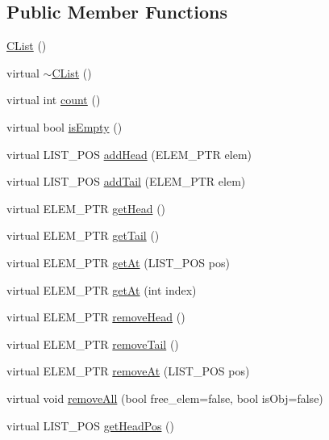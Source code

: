 \subsection*{Public Member Functions}
\begin{DoxyCompactItemize}
\item 
\hyperlink{class_c_list_ae6434f79bc2d54fbd3617214a313af97}{C\-List} ()
\item 
virtual \hyperlink{class_c_list_aba485cb512089f00dcd7a08720d8e5de}{$\sim$\-C\-List} ()
\item 
virtual int \hyperlink{class_c_list_aba5942fb294f8f3381bef96ffc8f5054}{count} ()
\item 
virtual bool \hyperlink{class_c_list_ab4db98accd12debb4330ad97b8b1dc37}{is\-Empty} ()
\item 
virtual L\-I\-S\-T\-\_\-\-P\-O\-S \hyperlink{class_c_list_af77b9f95976788ad6b74e825fad12e94}{add\-Head} (E\-L\-E\-M\-\_\-\-P\-T\-R elem)
\item 
virtual L\-I\-S\-T\-\_\-\-P\-O\-S \hyperlink{class_c_list_a81c34b9127ccce385b6699b9eaa799d1}{add\-Tail} (E\-L\-E\-M\-\_\-\-P\-T\-R elem)
\item 
virtual E\-L\-E\-M\-\_\-\-P\-T\-R \hyperlink{class_c_list_acc4c74c1684f630c99988a477b0a3eb7}{get\-Head} ()
\item 
virtual E\-L\-E\-M\-\_\-\-P\-T\-R \hyperlink{class_c_list_a4bb6b07562fdd0cc376e7f300ed3b9c0}{get\-Tail} ()
\item 
virtual E\-L\-E\-M\-\_\-\-P\-T\-R \hyperlink{class_c_list_a54795f456c006f4ab3647d5abfaa806c}{get\-At} (L\-I\-S\-T\-\_\-\-P\-O\-S pos)
\item 
virtual E\-L\-E\-M\-\_\-\-P\-T\-R \hyperlink{class_c_list_abec03f2f356c1bcd44ff3ddfa3e1e65a}{get\-At} (int index)
\item 
virtual E\-L\-E\-M\-\_\-\-P\-T\-R \hyperlink{class_c_list_a0e0dfa3bc3d93b9708d4a454e91d0994}{remove\-Head} ()
\item 
virtual E\-L\-E\-M\-\_\-\-P\-T\-R \hyperlink{class_c_list_adc7cb308e77a9e0550eecce9333b071b}{remove\-Tail} ()
\item 
virtual E\-L\-E\-M\-\_\-\-P\-T\-R \hyperlink{class_c_list_a4baf624e719e27016de00005bbbc0f7b}{remove\-At} (L\-I\-S\-T\-\_\-\-P\-O\-S pos)
\item 
virtual void \hyperlink{class_c_list_a5ee3e7395c54395c7f603c08a1b9d5cf}{remove\-All} (bool free\-\_\-elem=false, bool is\-Obj=false)
\item 
virtual L\-I\-S\-T\-\_\-\-P\-O\-S \hyperlink{class_c_list_a9d1f8b32387ace522e2fa3a5bf68975a}{get\-Head\-Pos} ()

\end{DoxyCompactItemize}

